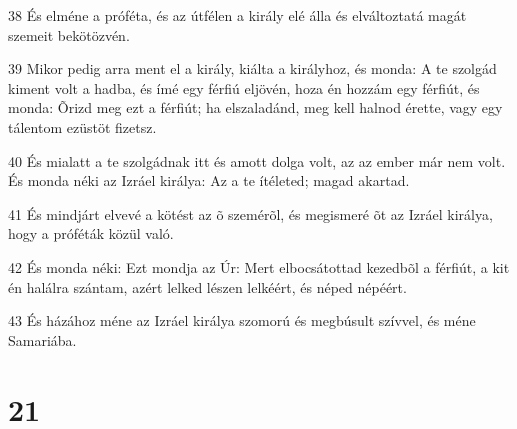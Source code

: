 \par 38 És elméne a próféta, és az útfélen a király elé álla és elváltoztatá magát szemeit bekötözvén.
\par 39 Mikor pedig arra ment el a király, kiálta a királyhoz, és monda: A te szolgád kiment volt a hadba, és ímé egy férfiú eljövén, hoza én hozzám egy férfiút, és monda: Õrizd meg ezt a férfiút; ha elszaladánd, meg kell halnod érette, vagy egy tálentom ezüstöt fizetsz.
\par 40 És mialatt a te szolgádnak itt és amott dolga volt, az az ember már nem volt. És monda néki az Izráel királya: Az a te ítéleted; magad akartad.
\par 41 És mindjárt elvevé a kötést az õ szemérõl, és megismeré õt az Izráel királya, hogy a próféták közül való.
\par 42 És monda néki: Ezt mondja az Úr: Mert elbocsátottad kezedbõl a férfiút, a kit én halálra szántam, azért lelked lészen lelkéért, és néped népéért.
\par 43 És házához méne az Izráel királya szomorú és megbúsult szívvel, és méne Samariába.

\chapter{21}

